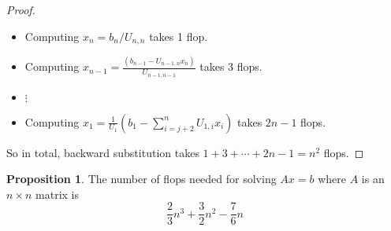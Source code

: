 \documentclass[12pt,a4paper]{article}
\theoremstyle{definition}
\newtheorem{proposition}[definition]{Proposition}
\begin{document}
\begin{proof}
	\hfill
	\begin{itemize}
		\item Computing $x_n = b_n / U_{n, n}$ takes 1 flop.
		\item Computing $x_{n - 1} = \frac{(b_{n - 1} - U_{n - 1, n} x_n)}{U_{n - 1, n - 1}}$ takes 3 flops.
		\item $\vdots$
		\item Computing $x_1 = \frac{1}{U_1} \left( b_1 - \sum_{i = j + 2}^{n} U_{1, i} x_i \right)$ takes $2n - 1$ flops.
	\end{itemize}
	So in total, backward substitution takes $1 + 3 + \cdots + 2n - 1 = n^2$ flops.
\end{proof}

\begin{proposition}
	The number of flops needed for solving $Ax = b$ where $A$ is an $n \times n$ matrix is
	\[
		\frac{2}{3} n^3	+ \frac{3}{2} n^2 - \frac{7}{6} n
	\]
\end{proposition}
\end{document}
